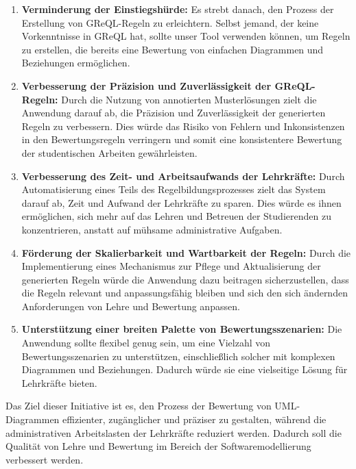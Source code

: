 \begin{enumerate}[itemsep=8pt, parsep=5pt]
    \item \textbf{Verminderung der Einstiegshürde:} Es strebt danach, den Prozess der Erstellung von GReQL-Regeln zu erleichtern. Selbst jemand, der keine Vorkenntnisse in GReQL hat, sollte unser Tool verwenden können, um Regeln zu erstellen, die bereits eine Bewertung von einfachen Diagrammen und Beziehungen ermöglichen.
    
    \item \textbf{Verbesserung der Präzision und Zuverlässigkeit der GReQL-Regeln:}
    Durch die Nutzung von annotierten Musterlösungen zielt die Anwendung darauf ab, die Präzision und Zuverlässigkeit der generierten Regeln zu verbessern. Dies würde das Risiko von Fehlern und Inkonsistenzen in den Bewertungsregeln verringern und somit eine konsistentere Bewertung der studentischen Arbeiten gewährleisten.
    
    \item \textbf{Verbesserung des Zeit- und Arbeitsaufwands der Lehrkräfte:}
    Durch Automatisierung eines Teils des Regelbildungsprozesses zielt das System darauf ab, Zeit und Aufwand der Lehrkräfte zu sparen. Dies würde es ihnen ermöglichen, sich mehr auf das Lehren und Betreuen der Studierenden zu konzentrieren, anstatt auf mühsame administrative Aufgaben.
    
    \item \textbf{Förderung der Skalierbarkeit und Wartbarkeit der Regeln:}
    Durch die Implementierung eines Mechanismus zur Pflege und Aktualisierung der generierten Regeln würde die Anwendung dazu beitragen sicherzustellen, dass die Regeln relevant und anpassungsfähig bleiben und sich den sich ändernden Anforderungen von Lehre und Bewertung anpassen.
    
    \item \textbf{Unterstützung einer breiten Palette von Bewertungsszenarien:}
    Die Anwendung sollte flexibel genug sein, um eine Vielzahl von Bewertungsszenarien zu unterstützen, einschließlich solcher mit komplexen Diagrammen und Beziehungen. Dadurch würde sie eine vielseitige Lösung für Lehrkräfte bieten.
    
\end{enumerate}

Das Ziel dieser Initiative ist es, den Prozess der Bewertung von UML-Diagrammen effizienter, zugänglicher und präziser zu gestalten, während die administrativen Arbeitslasten der Lehrkräfte reduziert werden. Dadurch soll die Qualität von Lehre und Bewertung im Bereich der Softwaremodellierung verbessert werden.
